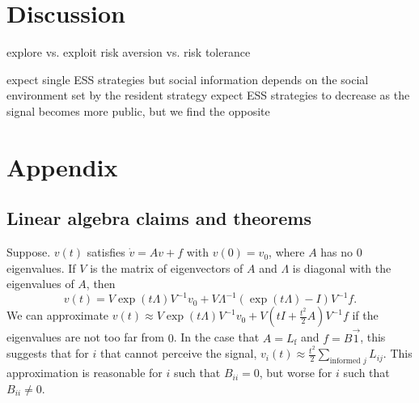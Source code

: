 \documentclass{article}
\begin{document}
\section{Discussion}
explore vs. exploit 
risk aversion vs. risk tolerance

expect single ESS strategies but social information depends on the social environment set by the resident strategy
expect ESS strategies to decrease as the signal becomes more public, but we find the opposite

\newpage
\section{Appendix}

\subsection{Linear algebra claims and theorems }

\begin{claim} 
\label{exp_approx}
Suppose. $v(t)$ satisfies $\dot{v}=Av+f$ with $v(0)=v_0$, where $A$ has no $0$ eigenvalues. If $V$ is the matrix of eigenvectors of $A$ and $\Lambda$ is diagonal with the eigenvalues of $A$, then
\begin{equation} \label{diffeq_solution}
v(t)=V\exp(t\Lambda)V^{-1}v_0+V\Lambda^{-1}(\exp(t\Lambda)-I)V^{-1}f.
\end{equation}
We can approximate $v(t)\approx V\exp(t\Lambda)V^{-1}v_0+V(tI+\frac{t^2}{2}A)V^{-1}f$ if the eigenvalues are not too far from $0$. In the case that $A=L_\text{f}$ and $f=B\vec{1}$, this suggests that for $i$ that cannot perceive the signal, $v_i(t)\approx \frac{t^2}{2}\sum_{\text{informed }j }L_{ij}.$ This approximation is reasonable for $i$ such that $B_{ii}=0$, but worse for $i$ such that $B_{ii}\neq 0$. 
\end{claim}
\end{document}
